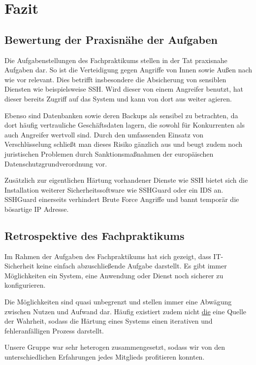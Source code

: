 \section{Fazit}

\subsection{Bewertung der Praxisnähe der Aufgaben}
Die Aufgabenstellungen des Fachpraktikums stellen in der Tat praxisnahe Aufgaben dar. So ist die Verteidigung gegen Angriffe von Innen sowie Außen nach wie vor relevant. Dies betrifft insbesondere die Absicherung von sensiblen Diensten wie beispielsweise \ac{SSH}. Wird dieser von einem Angreifer benutzt, hat dieser bereits Zugriff auf das System und kann von dort aus weiter agieren.

Ebenso sind Datenbanken sowie deren Backups als sensibel zu betrachten, da dort häufig vertrauliche Geschäftsdaten lagern, die sowohl für Konkurrenten als auch Angreifer wertvoll sind. Durch den umfassenden Einsatz von Verschlüsselung schließt man dieses Risiko gänzlich aus und beugt zudem noch juristischen Problemen durch Sanktionsmaßnahmen der europäischen Datenschutzgrundverordnung vor.

Zusätzlich zur eigentlichen Härtung vorhandener Dienste wie \ac{SSH} bietet sich die Installation weiterer Sicherheitssoftware wie SSHGuard oder ein \ac{IDS} an. SSHGuard einerseits verhindert Brute Force Angriffe und bannt temporär die bösartige IP Adresse.

\subsection{Retrospektive des Fachpraktikums}
Im Rahmen der Aufgaben des Fachpraktikums hat sich gezeigt, dass IT-Sicherheit keine einfach abzuschließende Aufgabe darstellt. Es gibt immer Möglichkeiten ein System, eine Anwendung oder Dienst noch sicherer zu konfigurieren. 

Die Möglichkeiten sind quasi unbegrenzt und stellen immer eine Abwägung zwischen Nutzen und Aufwand dar. Häufig existiert zudem nicht \underline{die} eine Quelle der Wahrheit, sodass die Härtung eines Systems einen iterativen und fehleranfälligen Prozess darstellt.

Unsere Gruppe war sehr heterogen zusammengesetzt, sodass wir von den unterschiedlichen Erfahrungen jedes Mitglieds profitieren konnten. 